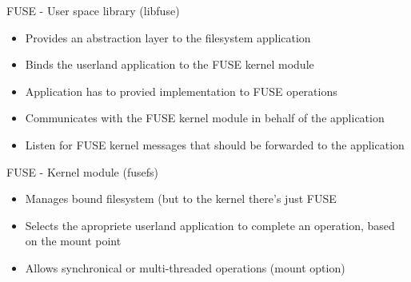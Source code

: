 \documentclass{beamer}
\begin{document}
\begin{frame}{FUSE - User space library (libfuse)}
	
	\begin{itemize}[<+->]

		\item{Provides an abstraction layer to the filesystem application}		
		\item{Binds the userland application to the FUSE kernel module}
		\item{Application has to provied implementation to FUSE operations}		
		\item{Communicates with the FUSE kernel module in behalf of the application}
		\item{Listen for FUSE kernel messages that should be forwarded to the application}
			
	\end{itemize}
	
\end{frame}

\begin{frame}{FUSE - Kernel module (fusefs)}
	
	\begin{itemize}[<+->]

		\item{Manages bound filesystem (but to the kernel there's just FUSE}
		\item{Selects the apropriete userland application to complete an operation, based on the mount point}
		\item{Allows synchronical or multi-threaded operations (mount option)}

	\end{itemize}
	
\end{frame}
\end{document}
